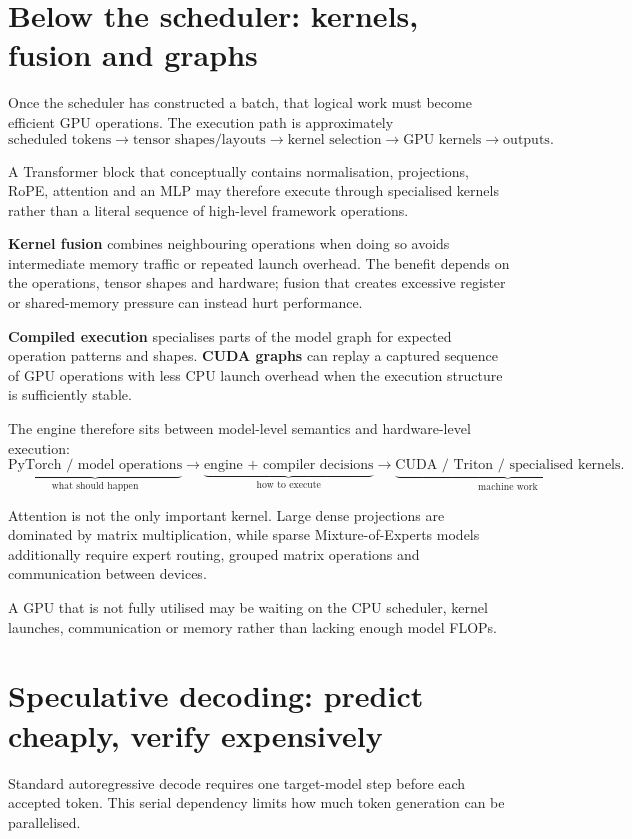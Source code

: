 \section{Below the scheduler: kernels, fusion and graphs}
\label{sec:inference-kernels}
Once the scheduler has constructed a batch, that logical work must become efficient GPU operations.
The execution path is approximately
\[
\text{scheduled tokens}
\rightarrow
\text{tensor shapes/layouts}
\rightarrow
\text{kernel selection}
\rightarrow
\text{GPU kernels}
\rightarrow
\text{outputs}.
\]

A Transformer block that conceptually contains normalisation, projections, RoPE, attention and an MLP may therefore execute through specialised kernels rather than a literal sequence of high-level framework operations.

\textbf{Kernel fusion} combines neighbouring operations when doing so avoids intermediate memory traffic or repeated launch overhead.
The benefit depends on the operations, tensor shapes and hardware; fusion that creates excessive register or shared-memory pressure can instead hurt performance.

\textbf{Compiled execution} specialises parts of the model graph for expected operation patterns and shapes.
\textbf{CUDA graphs} can replay a captured sequence of GPU operations with less CPU launch overhead when the execution structure is sufficiently stable.

The engine therefore sits between model-level semantics and hardware-level execution:
\[
\underbrace{\text{PyTorch / model operations}}_{\text{what should happen}}
\longrightarrow
\underbrace{\text{engine + compiler decisions}}_{\text{how to execute}}
\longrightarrow
\underbrace{\text{CUDA / Triton / specialised kernels}}_{\text{machine work}}.
\]

Attention is not the only important kernel.
Large dense projections are dominated by matrix multiplication, while sparse Mixture-of-Experts models additionally require expert routing, grouped matrix operations and communication between devices.

\begin{calloutpracticaltip}
A GPU that is not fully utilised may be waiting on the CPU scheduler, kernel launches, communication or memory rather than lacking enough model FLOPs.
\end{calloutpracticaltip}


\section{Speculative decoding: predict cheaply, verify expensively}
\label{sec:inference-speculative}
Standard autoregressive decode requires one target-model step before each accepted token.
This serial dependency limits how much token generation can be parallelised.

